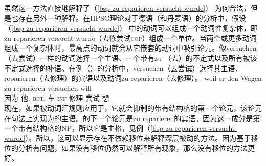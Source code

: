 \z
虽然这一方法直接地解释了（\ref{bsp-zu-reparieren-versucht-wurde}） 为何合法，但是也存在另外一种解释。在HPSG理论对于德语（和丹麦语）的分析中，假设（\ref{bsp-zu-reparieren-versucht-wurde}） 中的动词可以组成一个动词性复杂体，即zu reparieren versucht wurde（去修尝试\textsc{cop}）组成一个单位。当两个或更多动词组成一个复杂体时，最高点的动词就会从它嵌套的动词中吸引论元\citep{HN89a,HN94a,BvN98}。像versuchen（去尝试）一样的动词选择一个主语、一个带有zu （去）的不定式以及所有被该不定式选择的补语。在例（）的分析中，versuchen（去尝试）选择其主语、reparieren（去修理）的宾语以及动词zu reparieren（去修理）。
\ea
\gll weil er den Wagen zu reparieren versuchen will\\
     因为 他.\nom{} \textsc{det}.\acc{} 车 \textsc{inf} 修理 尝试 想\\
\z
现在，如果被动词汇规则应用于，它就会抑制的带有结构格的第一个论元，该论元在句法上实现为的主语。的下一个论元是zu reparieren的宾语。因为这一成分是第一个带有结构格的NP，所以它是主格，见例（\ref{bsp-zu-reparieren-versucht-wurde}）。所以，这可以显示存在不依赖移位来解释深层被动的方法。因为基于移位的分析有问题，如果没有移位仍然可以解释所有现象，那么没有移位的方法更好。
